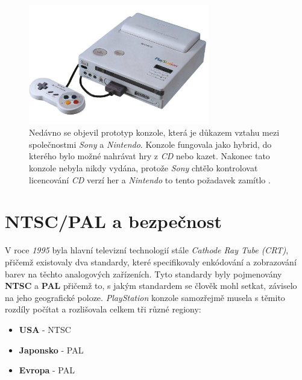 \begin{figure}[hbt]
	\centering
	\includegraphics[width=0.7\textwidth]{obrazky-figures/sony-and-nintendo-console.jpg}
	\caption[\textit{Nintendo PlayStation}]{Nedávno se objevil prototyp konzole, která je důkazem vztahu mezi společnostmi \textit{Sony} a \textit{Nintendo}. Konzole fungovala jako hybrid, do kterého bylo možné nahrávat hry z \textit{CD} nebo kazet. Nakonec tato konzole nebyla nikdy vydána, protože \textit{Sony} chtělo kontrolovat licencování \textit{CD} verzí her a \textit{Nintendo} to tento požadavek zamítlo \cite{PlayStationNintendo}.}
	\label{sony-and-nintendo-console}
\end{figure}

\section{NTSC/PAL a bezpečnost}

V roce \textit{1995} byla hlavní televizní technologií stále \textit{Cathode Ray Tube (CRT)}, přičemž existovaly dva standardy, které specifikovaly enkódování a zobrazování barev na těchto analogových zařízeních. 
Tyto standardy byly pojmenovány \textbf{NTSC} a \textbf{PAL} přičemž to, s jakým standardem se člověk mohl setkat, záviselo na jeho geografické poloze. 
\textit{PlayStation} konzole samozřejmě musela s těmito rozdíly počítat a rozlišovala celkem tři různé regiony:\\[\baselineskip]

\begin{minipage}{\textwidth}
\begin{itemize}
    \item{\textbf{USA} - NTSC}
    \item{\textbf{Japonsko} - PAL}
    \item{\textbf{Evropa} - PAL}
\end{itemize}
\end{minipage}
\\[\baselineskip]

